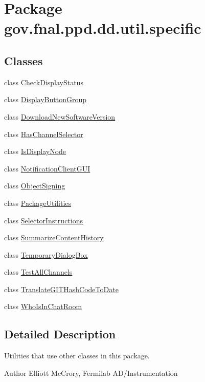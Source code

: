 \hypertarget{namespacegov_1_1fnal_1_1ppd_1_1dd_1_1util_1_1specific}{\section{Package gov.\-fnal.\-ppd.\-dd.\-util.\-specific}
\label{namespacegov_1_1fnal_1_1ppd_1_1dd_1_1util_1_1specific}
}
\subsection*{Classes}
\begin{DoxyCompactItemize}
\item 
class \hyperlink{classgov_1_1fnal_1_1ppd_1_1dd_1_1util_1_1specific_1_1CheckDisplayStatus}{Check\-Display\-Status}
\item 
class \hyperlink{classgov_1_1fnal_1_1ppd_1_1dd_1_1util_1_1specific_1_1DisplayButtonGroup}{Display\-Button\-Group}
\item 
class \hyperlink{classgov_1_1fnal_1_1ppd_1_1dd_1_1util_1_1specific_1_1DownloadNewSoftwareVersion}{Download\-New\-Software\-Version}
\item 
class \hyperlink{classgov_1_1fnal_1_1ppd_1_1dd_1_1util_1_1specific_1_1HasChannelSelector}{Has\-Channel\-Selector}
\item 
class \hyperlink{classgov_1_1fnal_1_1ppd_1_1dd_1_1util_1_1specific_1_1IsDisplayNode}{Is\-Display\-Node}
\item 
class \hyperlink{classgov_1_1fnal_1_1ppd_1_1dd_1_1util_1_1specific_1_1NotificationClientGUI}{Notification\-Client\-G\-U\-I}
\item 
class \hyperlink{classgov_1_1fnal_1_1ppd_1_1dd_1_1util_1_1specific_1_1ObjectSigning}{Object\-Signing}
\item 
class \hyperlink{classgov_1_1fnal_1_1ppd_1_1dd_1_1util_1_1specific_1_1PackageUtilities}{Package\-Utilities}
\item 
class \hyperlink{classgov_1_1fnal_1_1ppd_1_1dd_1_1util_1_1specific_1_1SelectorInstructions}{Selector\-Instructions}
\item 
class \hyperlink{classgov_1_1fnal_1_1ppd_1_1dd_1_1util_1_1specific_1_1SummarizeContentHistory}{Summarize\-Content\-History}
\item 
class \hyperlink{classgov_1_1fnal_1_1ppd_1_1dd_1_1util_1_1specific_1_1TemporaryDialogBox}{Temporary\-Dialog\-Box}
\item 
class \hyperlink{classgov_1_1fnal_1_1ppd_1_1dd_1_1util_1_1specific_1_1TestAllChannels}{Test\-All\-Channels}
\item 
class \hyperlink{classgov_1_1fnal_1_1ppd_1_1dd_1_1util_1_1specific_1_1TranslateGITHashCodeToDate}{Translate\-G\-I\-T\-Hash\-Code\-To\-Date}
\item 
class \hyperlink{classgov_1_1fnal_1_1ppd_1_1dd_1_1util_1_1specific_1_1WhoIsInChatRoom}{Who\-Is\-In\-Chat\-Room}
\end{DoxyCompactItemize}


\subsection{Detailed Description}
Utilities that use other classes in this package.

\begin{DoxyAuthor}{Author}
Elliott Mc\-Crory, Fermilab A\-D/\-Instrumentation 
\end{DoxyAuthor}
